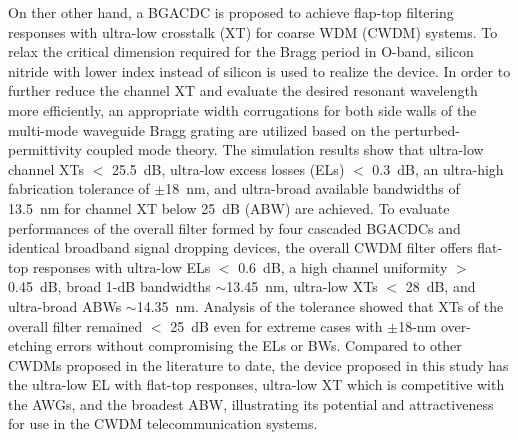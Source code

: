 \begin{abstract*}
    On ther other hand, a BGACDC is proposed 
    to achieve flap-top filtering responses with ultra-low crosstalk (XT) for coarse WDM (CWDM) systems. 
    To relax the critical dimension required for the Bragg period in O-band, 
    silicon nitride with lower index instead of silicon is used to realize the device. 
    In order to further reduce the channel XT and evaluate the desired resonant wavelength more efficiently, 
    an appropriate width corrugations for both side walls of the multi-mode waveguide Bragg grating are 
    utilized based on the perturbed-permittivity coupled mode theory. 
    The simulation results show that ultra-low channel XTs $<$ 25.5~dB, 
    ultra-low excess losses (ELs) $<$ 0.3~dB, an ultra-high fabrication tolerance of $\pm$18~nm, 
    and ultra-broad available bandwidths of 13.5~nm for channel XT below 25~dB (ABW)
    are achieved. 
    To evaluate performances of the overall filter formed by four cascaded BGACDCs and identical broadband signal dropping devices, 
    the overall CWDM filter offers flat-top responses with ultra-low ELs $<$ 0.6~dB, 
    a high channel uniformity $>$ 0.45~dB, broad 1-dB bandwidths $\sim$13.45~nm, 
    ultra-low XTs $<$ 28~dB, and ultra-broad ABWs $\sim$14.35~nm. 
    Analysis of the tolerance showed that XTs of the overall filter remained $<$ 25~dB 
    even for extreme cases with $\pm$18-nm over-etching errors without compromising the ELs or BWs.
    Compared to other CWDMs proposed in the literature to date, 
    the device proposed in this study has the ultra-low EL with flat-top responses, 
    ultra-low XT which is competitive with the AWGs, 
    and the broadest ABW, 
    illustrating its  potential and  attractiveness for use in the CWDM telecommunication systems. 
\end{abstract*}